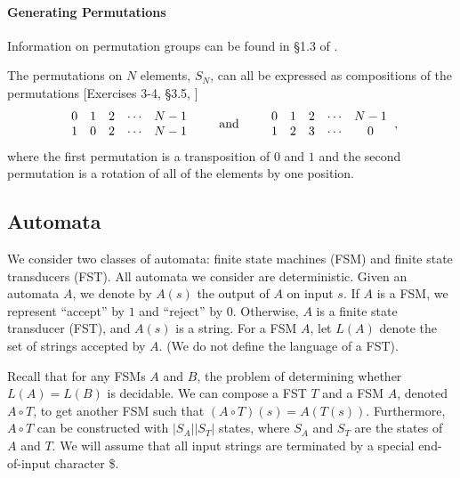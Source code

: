 \documentclass{llncs}
\begin{document}
\paragraph{Generating Permutations}
Information on permutation groups can be found in \S1.3 of \cite{dummitfoote}.

\makeatletter
\renewcommand{\@cite}[1]{#1}
\makeatother
The permutations on \(N\) elements, \(S_{N}\), can all be expressed as compositions of the permutations [Exercises 3-4, \S3.5, \cite{dummitfoote}]
\[\begin{tabular}{c@{\hspace{1em}}c@{\hspace{1em}}c@{\hspace{1em}}c@{\hspace{1em}}c}
0 & 1 & 2 & \(\dotsm\) & \(N-1\)\\
1 & 0 & 2 & \(\dotsm\) & \(N-1\)
\end{tabular}
\qquad\textrm{and}\qquad
\begin{tabular}{c@{\hspace{1em}}c@{\hspace{1em}}c@{\hspace{1em}}c@{\hspace{1em}}c}
0 & 1 & 2 & \(\dotsm\) & \(N-1\)\\
1 & 2 & 3 & \(\dotsm\) & 0
\end{tabular},\]
where the first permutation is a transposition of \(0\) and \(1\) and the second permutation is a rotation of all of the elements by one position.
\makeatletter
\renewcommand{\@cite}[1]{[#1]}
\makeatother

\subsection{Automata}
We consider two classes of automata: finite state machines (FSM) and finite
state transducers (FST). All automata we consider are deterministic. Given an
automata $A$, we denote by $A(s)$ the output of $A$ on input $s$. If $A$ is a
FSM, we represent ``accept'' by $1$ and ``reject'' by $0$. Otherwise, $A$ is a
finite state transducer (FST), and $A(s)$ is a string. For a FSM $A$, let $L(A)$
denote the set of strings accepted by $A$. (We do not define the language of a
FST).

Recall that for any FSMs $A$ and $B$, the problem of determining whether $L(A) =
L(B)$ is decidable. We can compose a FST $T$ and a FSM $A$, denoted $A \circ T$,
to get another FSM such that $(A\circ T)(s) = A(T(s))$.
Furthermore, $A\circ T$ can be constructed with $|S_A||S_T|$ states,
where $S_A$ and $S_T$ are the states of $A$ and $T$.
We will assume that all input strings are terminated by a special end-of-input character \$.

%
%


\end{document}
